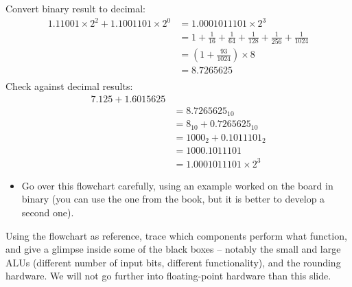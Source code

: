 \ifnum{}
\begin{frame}[fragile]
Convert binary result to decimal:
\begin{align*}    
1.11001 \times 2^2 + 1.1001101 \times 2^0 
&= 1.0001011101 \times 2^3  \\
&= 1 + \frac{1}{16}+\frac{1}{64} +\frac{1}{128}+\frac{1}{256} +\frac{1}{1024}\\
    &= (1+\frac{93}{1024}) \times 8\\
    &= 8.7265625\\
\end{align*}
Check against decimal results:
\begin{align*}
    7.125 + 1.6015625 \\
    &= 8.7265625_{10}\\
   &= 8_{10} + 0.7265625_{10}\\
    &= 1000_2 + 0.1011101_2\\
    &= 1000.1011101\\
    &= 1.0001011101 \times 2^3
\end{align*}

\BNotes\ifnum{}
\begin{itemize}
\item Go over this flowchart carefully, using an example worked on the
board in binary (you can use the one from the book, but it is better
to develop a second one). 
\end{itemize}
\fi\ENotes
\end{frame}
\fi

\begin{frame}[fragile]


\BNotes\ifnum{}
Using the flowchart as reference, trace which components perform what
function, and give a glimpse inside some of the black boxes -- notably
the small and large ALUs (different number of input bits, different
functionality), and the rounding hardware. We will not go further into
floating-point hardware than this slide.
\fi\ENotes
\end{frame}

